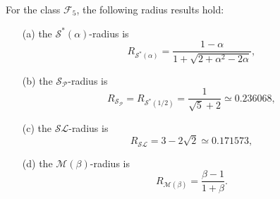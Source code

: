 \documentclass{amsart}
\begin{document}
\begin{theorem}\label{th6} 
For the class $\mathcal{F}_5$,    the following radius results hold:
\begin{enumerate}
\item[(a)]\label{i28} the ${\mathcal{S}^*(\alpha)}$-radius  is \[R_{\mathcal{S}^*(\alpha)}=\frac{ 1-\alpha }{1+\sqrt{2+\alpha ^2-2\alpha }},\]
\item[(b)]\label{i7}  the ${\mathcal{S}_{\mathcal{P}}}$-radius  is \[R_{\mathcal{S}_{\mathcal{P}}}=R_{\mathcal{S}^*{( 1/2 )}}=\frac{1}{\sqrt5+2}\simeq0.236068,\]
\item[(c)]\label{i8}  the ${\mathcal{SL}}$-radius   is \[R_{\mathcal{SL}}=3-2\sqrt2\simeq0.171573, \]
\item[(d)]\label{i13} the ${\mathcal{M}(\beta)}$-radius  is \[R_{\mathcal{M}(\beta)}= \frac{\beta -1}{1+\beta }.\]
\end{enumerate}
\end{theorem}
\end{document}
